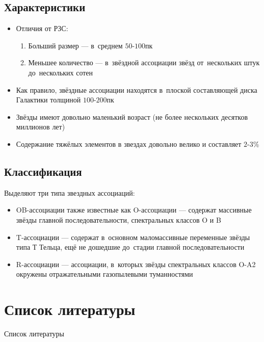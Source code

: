 \documentclass{beamer}
\begin{document}
    \subsection{Характеристики}
    \begin{frame}
        \begin{itemize}
            \item Отличия от РЗС:
            \begin{enumerate}
                \item Больший размер --- в~среднем $50$-$100$пк
                \item Меньшее количество --- в~звёздной ассоциации звёзд от~нескольких штук до~нескольких сотен
            \end{enumerate}
            \item Как правило, звёздные ассоциации находятся в~плоской составляющей диска Галактики толщиной $100$-$200$пк
            \item Звёзды имеют довольно маленький возраст (не более нескольких десятков миллионов лет)
            \item Содержание тяжёлых элементов в звездах довольно велико и составляет $2$-$3$\%
        \end{itemize}
    \end{frame}
    \subsection{Классификация}
    \begin{frame}
        Выделяют три типа звездных ассоциаций:
        \begin{itemize}
            \item OB-ассоциации также известные как O-ассоциации --- содержат массивные звёзды главной последовательности, 
            спектральных классов O и B
            \item T-ассоциации --- содержат в~основном маломассивные переменные звёзды типа Т Тельца, 
            ещё не дошедшие до~стадии главной последовательности
            \item R-ассоциации --- ассоциации, в~которых звёзды спектральных классов O-A2 окружены отражательными газопылевыми туманностями
        \end{itemize}
    \end{frame}

    \section{Список литературы}
    \begin{frame}[t, allowframebreaks]{Список литературы}
        
        
    \end{frame}
\end{document}
